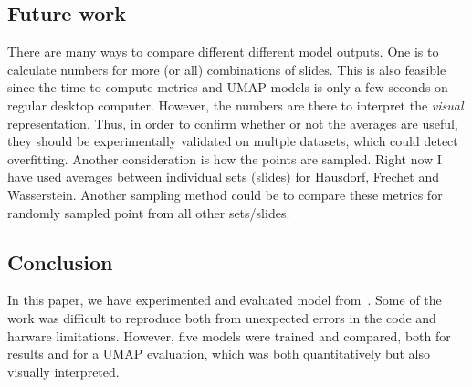 \documentclass[10pt,twocolumn,letterpaper]{article}
\begin{document}
\subsection{Future work}
There are many ways to compare different different model outputs. One is to calculate numbers for more (or all) combinations of slides. This is also feasible since the time to compute metrics and \gls{UMAP} models is only a few seconds on regular desktop computer. However, the numbers are there to interpret the \textit{visual} representation. Thus, in order to confirm whether or not the averages are useful, they should be experimentally validated on multple datasets, which could detect overfitting. Another consideration is how the points are sampled. Right now I have used averages between individual sets (slides) for Hausdorf, Frechet and Wasserstein. Another sampling method could be to compare these metrics for randomly sampled point from all other sets/slides.

\subsection{Conclusion}
In this paper, we have experimented and evaluated model from~\cite{sslUMAP}. Some of the work was difficult to reproduce both from unexpected errors in the code and harware limitations. However, five models were trained and compared, both for results and for a \gls{UMAP} evaluation, which was both quantitatively but also visually interpreted. 


{\small


}
\end{document}
